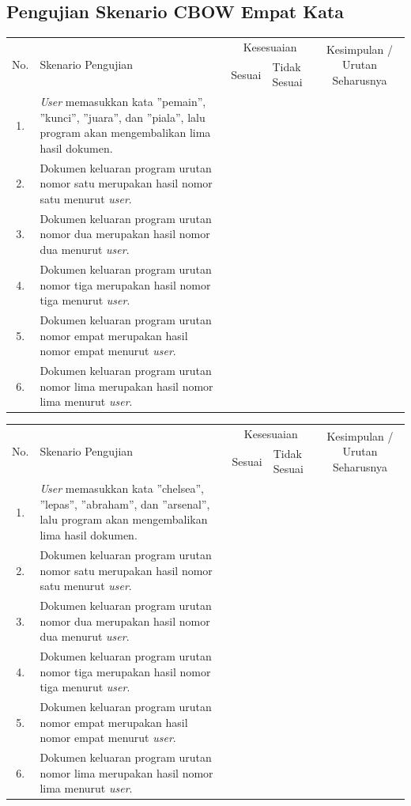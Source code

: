 \documentclass[12pt]{report}
\begin{document}
\newpage
\subsection*{\thesubsection\quad Pengujian Skenario CBOW Empat Kata}
\begin{center}
\begin{tabular}{ |c|    m{6cm}         |c|m{1cm}| c |  }
\hline
\multirow{2}{*}{No.} & \multirow{2}{6cm}{Skenario Pengujian} & \multicolumn{2}{c|}{Kesesuaian} &\multirow{2}{2.3cm}{Kesimpulan / Urutan Seharusnya} \\\cline{3-4}
	&			& Sesuai	&	Tidak Sesuai   	&		\\
 \hline
1.&\textit{User} memasukkan kata ''pemain'', ''kunci'', ''juara'', dan ''piala'', lalu program akan mengembalikan lima hasil dokumen.&	&	& \\
\hline
 2.&Dokumen keluaran program urutan nomor satu merupakan hasil nomor satu menurut \textit{user}.&	&	& \\
 \hline
 3.&Dokumen keluaran program urutan nomor dua merupakan hasil nomor dua menurut \textit{user}.&	&	& \\
 \hline
 4.&Dokumen keluaran program urutan nomor tiga merupakan hasil nomor tiga menurut \textit{user}.&	&	& \\
 \hline
5.&Dokumen keluaran program urutan nomor empat merupakan hasil nomor empat menurut \textit{user}.&	&	& \\
 \hline
6.&Dokumen keluaran program urutan nomor lima merupakan hasil nomor lima menurut \textit{user}.&	&	& \\
 \hline
\end{tabular}
\end{center}

\begin{center}
\begin{tabular}{ |c|    m{6cm}         |c|m{1cm}| c |  }
\hline
\multirow{2}{*}{No.} & \multirow{2}{6cm}{Skenario Pengujian} & \multicolumn{2}{c|}{Kesesuaian} &\multirow{2}{2.3cm}{Kesimpulan / Urutan Seharusnya} \\\cline{3-4}
	&			& Sesuai	&	Tidak Sesuai   	&		\\
 \hline
1.&\textit{User} memasukkan kata ''chelsea'', ''lepas'', ''abraham'', dan ''arsenal'', lalu program akan mengembalikan lima hasil dokumen.&	&	& \\
\hline
 2.&Dokumen keluaran program urutan nomor satu merupakan hasil nomor satu menurut \textit{user}.&	&	& \\
 \hline
 3.&Dokumen keluaran program urutan nomor dua merupakan hasil nomor dua menurut \textit{user}.&	&	& \\
 \hline
 4.&Dokumen keluaran program urutan nomor tiga merupakan hasil nomor tiga menurut \textit{user}.&	&	& \\
 \hline
5.&Dokumen keluaran program urutan nomor empat merupakan hasil nomor empat menurut \textit{user}.&	&	& \\
 \hline
6.&Dokumen keluaran program urutan nomor lima merupakan hasil nomor lima menurut \textit{user}.&	&	& \\
 \hline
\end{tabular}
\end{center}
\end{document}
